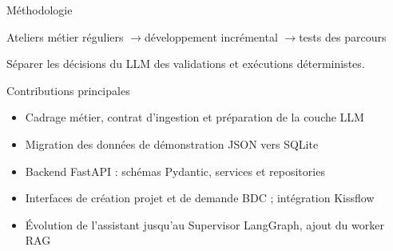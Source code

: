 \documentclass[aspectratio=169,11pt,french]{beamer}
\begin{document}
\begin{frame}{Méthodologie}
  \vspace{.55cm}
  \begin{center}
  \end{center}
  \vspace{.65cm}
  \begin{center}
    \large Ateliers métier réguliers \quad$\rightarrow$\quad développement incrémental
    \quad$\rightarrow$\quad tests des parcours
  \end{center}
  \vspace{.25cm}
  \begin{center}
    Séparer les décisions du LLM des validations et exécutions déterministes.
  \end{center}
\end{frame}

\begin{frame}{Contributions principales}
  \vspace{.3cm}
  \begin{itemize}
    \item Cadrage métier, contrat d'ingestion et préparation de la couche LLM
    \vspace{.35cm}
    \item Migration des données de démonstration JSON vers SQLite
    \vspace{.35cm}
    \item Backend FastAPI : schémas Pydantic, services et repositories
    \vspace{.35cm}
    \item Interfaces de création projet et de demande BDC ; intégration Kissflow
    \vspace{.35cm}
    \item Évolution de l'assistant jusqu'au Supervisor LangGraph, ajout du worker RAG
  \end{itemize}
\end{frame}
\end{document}
